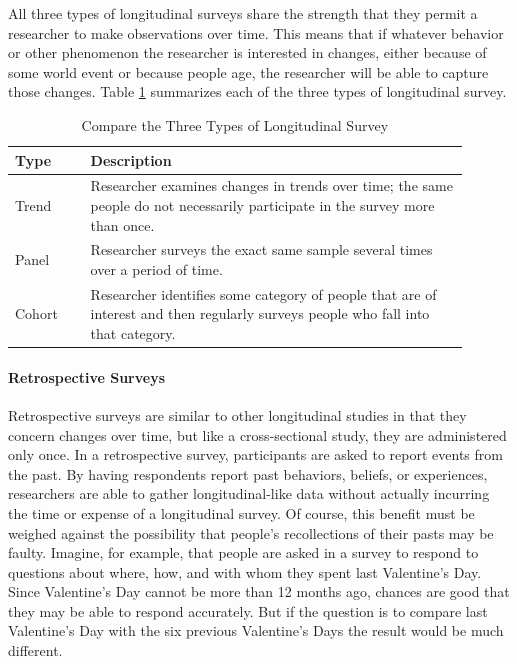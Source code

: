 All three types of longitudinal surveys share the strength that they permit a researcher to make observations over time. This means that if whatever behavior or other phenomenon the researcher is interested in changes, either because of some world event or because people age, the researcher will be able to capture those changes. Table \ref{tab08.01} summarizes each of the three types of longitudinal survey.

\begin{table}[H]
	\centering
	\begin{tabularx}{0.95\linewidth}{p{0.15\linewidth}p{0.75\linewidth}}
		\toprule
		\textbf{Type} & \textbf{Description} \\
		\midrule
		Trend & Researcher examines changes in trends over time; the same people do not necessarily participate in the survey more than once. \\
		Panel & Researcher surveys the exact same sample several times over a period of time. \\
		Cohort & Researcher identifies some category of people that are of interest and then regularly surveys people who fall into that category.\\
		\bottomrule
	\end{tabularx}
	\caption{Compare the Three Types of Longitudinal Survey}
	\label{tab08.01}
\end{table}

\paragraph{Retrospective Surveys}

Retrospective surveys are similar to other longitudinal studies in that they concern changes over time, but like a cross-sectional study, they are administered only once. In a retrospective survey, participants are asked to report events from the past. By having respondents report past behaviors, beliefs, or experiences, researchers are able to gather longitudinal-like data without actually incurring the time or expense of a longitudinal survey. Of course, this benefit must be weighed against the possibility that people's recollections of their pasts may be faulty. Imagine, for example, that people are asked in a survey to respond to questions about where, how, and with whom they spent last Valentine's Day. Since Valentine's Day cannot be more than 12 months ago, chances are good that they may be able to respond accurately. But if the question is to compare last Valentine's Day with the six previous Valentine's Days the result would be much different.

